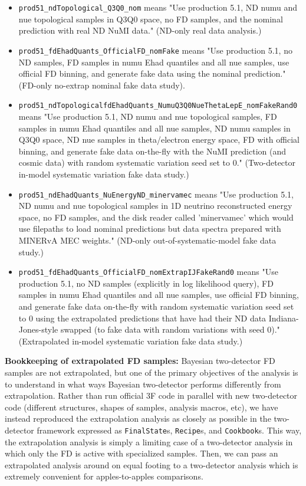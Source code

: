 \documentclass{article}
\begin{document}
\begin{itemize}
    \item \texttt{prod51\_ndTopological\_Q3Q0\_nom} means "Use production 5.1, ND numu and nue topological samples in Q3Q0 space, no FD samples, and the nominal prediction with real ND NuMI data." (ND-only real data analysis.)
    \item \texttt{prod51\_fdEhadQuants\_OfficialFD\_nomFake} means "Use production 5.1, no ND samples, FD samples in numu Ehad quantiles and all nue samples, use official FD binning, and generate fake data using the nominal prediction." (FD-only no-extrap nominal fake data study).
    \item \texttt{prod51\_ndTopologicalfdEhadQuants\_NumuQ3Q0NueThetaLepE\_nomFakeRand0} means "Use production 5.1, ND numu and nue topological samples, FD samples in numu Ehad quantiles and all nue samples, ND numu samples in Q3Q0 space, ND nue samples in theta/electron energy space, FD with official binning, and generate fake data on-the-fly with the NuMI prediction (and cosmic data) with random systematic variation seed set to 0." (Two-detector in-model systematic variation fake data study.)
    \item \texttt{prod51\_ndEhadQuants\_NuEnergyND\_minervamec} means "Use production 5.1, ND numu and nue topological samples in 1D neutrino reconstructed energy space, no FD samples, and the disk reader called 'minervamec' which would use filepaths to load nominal predictions but data spectra prepared with MINERvA MEC weights." (ND-only out-of-systematic-model fake data study.)
    \item \texttt{prod51\_fdEhadQuants\_OfficialFD\_nomExtrapIJFakeRand0} means "Use production 5.1, no ND samples (explicitly in log likelihood query), FD samples in numu Ehad quantiles and all nue samples, use official FD binning, and generate fake data on-the-fly with random systematic variation seed set to 0 using the extrapolated predictions that have had their ND data Indiana-Jones-style swapped (to fake data with random variations with seed 0)." (Extrapolated in-model systematic variation fake data study.)
\end{itemize}

\textbf{Bookkeeping of extrapolated FD samples:} Bayesian two-detector FD samples are not extrapolated, but one of the primary objectives of the analysis is to understand in what ways Bayesian two-detector performs differently from extrapolation. Rather than run official 3F code in parallel with new two-detector code (different structures, shapes of samples, analysis macros, etc), we have instead reproduced the extrapolation analysis as closely as possible in the two-detector framework expressed as \texttt{FinalState}s, \texttt{Recipe}s, and \texttt{Cookbook}s. This way, the extrapolation analysis is simply a limiting case of a two-detector analysis in which only the FD is active with specialized samples. Then, we can pass an extrapolated analysis around on equal footing to a two-detector analysis which is extremely convenient for apples-to-apples comparisons.
\end{document}
